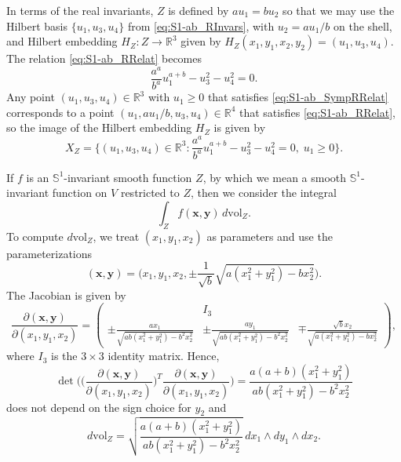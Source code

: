 \documentclass[twoside]{amsart}
\theoremstyle{definition}
\theoremstyle{remark}
\numberwithin{equation}{section}
\newcommand{\Sp}{\mathbb{S}}
\newcommand{\R}{\mathbb{R}}
\newcommand{\vol}{\text{vol}}
\begin{document}
In terms of the real invariants, $Z$ is defined by $a u_1 = b u_2$ so that we may use the Hilbert basis $\{ u_1, u_3, u_4 \}$ from \eqref{eq:S1-ab_RInvars},
with $u_2 = a u_1/b$ on the shell, and Hilbert embedding $H_Z\colon Z\to\R^3$ given by $H_Z(x_1,y_1,x_2,y_2) = (u_1, u_3, u_4)$.
The relation \eqref{eq:S1-ab_RRelat} becomes
\begin{equation}
\label{eq:S1-ab_SympRRelat}
    \frac{a^a}{b^a} u_1^{a + b} - u_3^2 - u_4^2 = 0.
\end{equation}
Any point $(u_1, u_3, u_4)\in\R^3$ with $u_1\geq 0$ that satisfies \eqref{eq:S1-ab_SympRRelat} corresponds to a point $(u_1, a u_1/b, u_3, u_4) \in\R^4$
that satisfies \eqref{eq:S1-ab_RRelat}, so the image of the Hilbert embedding $H_Z$ is given by
\begin{equation}
\label{eq:S1-ab_SympImHilb}
    X_Z = \Big\{
    (u_1, u_3, u_4)\in\R^3 :
    \frac{a^a}{b^a} u_1^{a + b} - u_3^2 - u_4^2 = 0,
    \;
    u_1 \geq 0
    \Big\}.
\end{equation}

If $f$ is an $\Sp^1$-invariant smooth function $Z$, by which we mean a smooth $\Sp^1$-invariant function on $V$ restricted to $Z$,
then we consider the integral
\begin{equation}
\label{eq:S1-ab_SympInt0}
    \int_Z f(\mathbf{x}, \mathbf{y}) \, d\vol_Z.
\end{equation}
To compute $d\vol_Z$, we treat $(x_1, y_1, x_2)$ as parameters and use the parameterizations
\[
    (\mathbf{x}, \mathbf{y})
    =
    \Big(x_1, y_1, x_2, \pm\frac{1}{\sqrt{b}} \sqrt{a (x_1^2 + y_1^2) -  bx_2^2}\Big).
\]
The Jacobian is given by
\[
    \frac{\partial (\mathbf{x}, \mathbf{y})}{ \partial (x_1, y_1, x_2)}
    =
    \begin{pmatrix}
           &   I_3   &   
        \\
        \pm\frac{a x_1}{\sqrt{ab (x_1^2 + y_1^2) - b^2 x_2^2}}
            &   \pm\frac{a y_1}{\sqrt{ab (x_1^2 + y_1^2) - b^2 x_2^2}}
            &   \mp\frac{\sqrt{b} x_2}{\sqrt{a(x_1^2 + y_1^2) - b x_2^2}}
    \end{pmatrix},
\]
where $I_3$ is the $3\times 3$ identity matrix. Hence,
\[
    \det \Bigg(\Big(\frac{\partial (\mathbf{x}, \mathbf{y})}{ \partial (x_1, y_1, x_2)}\Big)^T \frac{\partial (\mathbf{x}, \mathbf{y})}{ \partial (x_1, y_1, x_2)}\Bigg)
    =      \frac{ a(a + b) (x_1^2 + y_1^2)}{ab (x_1^2 + y_1^2) - b^2 x_2^2}
\]
does not depend on the sign choice for $y_2$ and
\begin{equation}
\label{eq:S1-ab_SympVolForm}
    d\vol_Z = \sqrt{ \frac{ a(a + b) (x_1^2 + y_1^2)}{ab (x_1^2 + y_1^2) - b^2 x_2^2} } \, dx_1 \wedge dy_1 \wedge dx_2.
\end{equation}
\end{document}
